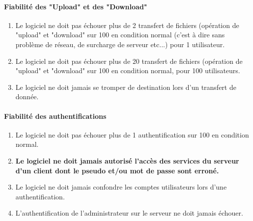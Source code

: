 \documentclass[10pt,a4paper]{report}
\begin{document}
\paragraph{Fiabilité des "Upload" et des "Download"}
	\begin{enumerate}
	
		\item Le logiciel ne doit pas échouer plus de 2 transfert de fichiers (opération de "upload" et "download" sur 100 en condition normal (c'est à dire sans problème de réseau, de surcharge de serveur etc...) pour 1 utilisateur.
		
		\item Le logiciel ne doit pas échouer plus de 20 transfert de fichiers (opération de "upload" et "download" sur 100 en condition normal, pour 100 utilisateurs.
		
		\item Le logiciel ne doit jamais se tromper de destination lors d'un transfert de donnée.
	\end{enumerate}		 

\paragraph{Fiabilité des authentifications}

	\begin{enumerate}
	
		\item Le logiciel ne doit pas échouer plus de 1 authentification sur 100 en condition normal.
		
		\item \textbf{Le logiciel ne doit jamais autorisé l'accès des services du serveur d'un client dont le pseudo et/ou mot de passe sont erroné.}
		
		\item Le logiciel ne doit jamais confondre les comptes utilisateurs lors d'une authentification.
		
		\item L'authentification de l'administrateur sur le serveur ne doit jamais échouer.
		
	\end{enumerate}
\end{document}

